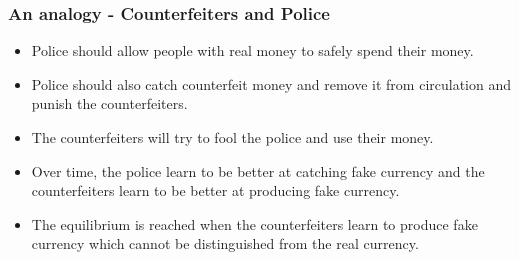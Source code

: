 \documentclass{beamer}
\begin{document}
\begin{frame}
    \frametitle{An analogy - Counterfeiters and Police}
    \begin{itemize}
        \item {Police should allow people with real money to safely spend their money.}
        \pause \item {Police should also catch counterfeit money and remove it from circulation and punish the counterfeiters.}
        \pause \item {The counterfeiters will try to fool the police and use their money.}
        \pause \item {Over time, the police learn to be better at catching fake currency and 
        the counterfeiters learn to be better at producing fake currency.}
        \pause \item {The equilibrium is reached when the counterfeiters learn to produce fake 
        currency which cannot be distinguished from the real currency.}
    \end{itemize}
\end{frame}
\end{document}
